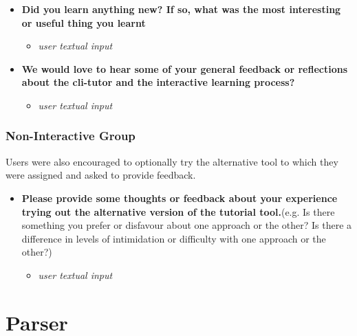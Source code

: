 \begin{itemize}
	\item  \textbf{Did you learn anything new? If so, what was the most interesting or useful thing you learnt}
	      \begin{itemize}
		      \item \textit{user textual input}
	      \end{itemize}

	\item  \textbf{We would love to hear some of your general feedback or reflections about the cli-tutor and the interactive learning process?}
	      \begin{itemize}
		      \item \textit{user textual input}
	      \end{itemize}
\end{itemize}

\subsubsection{Non-Interactive Group}
Users were also encouraged to optionally try the alternative tool to which they were assigned and asked to provide feedback.
\begin{itemize}
	\item  \textbf{Please provide some thoughts or feedback about your experience trying out the alternative version of the tutorial tool.}(e.g. Is there something you prefer or disfavour about one approach or the other? Is there a difference in levels of intimidation or difficulty with one approach or the other?)
	      \begin{itemize}
		      \item \textit{user textual input}
	      \end{itemize}
\end{itemize}

\section{Parser}

